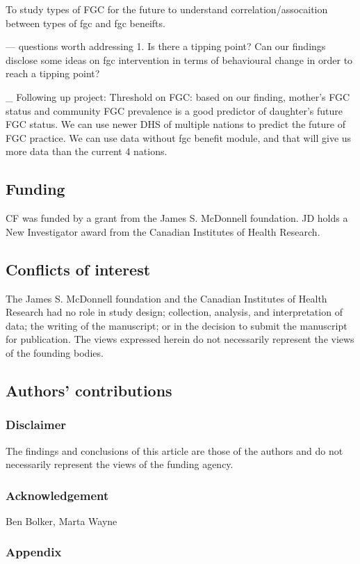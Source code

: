 \documentclass[12pt,]{article}
\begin{document}
To study types of FGC for the future to understand correlation/assocaition between types of fgc and fgc beneifts.

--- questions worth addressing
1. Is there a tipping point?  Can our findings disclose some ideas on fgc intervention in terms of behavioural change in order to reach a tipping point?

_ Following up project:
 Threshold on FGC:  based on our finding, mother’s FGC status and community FGC prevalence is a good predictor of daughter’s future FGC status.  We can use newer DHS of multiple nations to predict the future of FGC practice.  We can use data without fgc benefit module, and that will give us more data than the current 4 nations.

\subsection{Funding}\label{Funding}

CF was funded by a grant from the James S. McDonnell foundation. JD holds a New Investigator award from the Canadian Institutes of Health Research.

\subsection{Conflicts of interest}\label{Conflicts-of-Interest}

The James S. McDonnell foundation and the Canadian Institutes of Health Research had no role in study design; collection, analysis, and interpretation of data; the writing of the manuscript; or in the decision to submit the manuscript for publication.  The views expressed herein do not necessarily represent the views of the founding bodies.

\subsection{Authors' contributions}\label{Authors'-contributions}

\subsubsection{Disclaimer}\label{disclaimer}

The findings and conclusions of this article are those of the authors
and do not necessarily represent the views of the funding agency.

\subsubsection{Acknowledgement}\label{Acknowledgement}
Ben Bolker,  Marta Wayne

\subsubsection{Appendix}\label{appendix-1}


\end{document}
